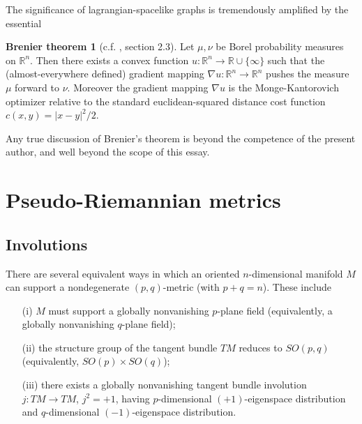 \documentclass[12pt]{amsart}
\theoremstyle{definition}
\newtheorem*{brenier}{Brenier theorem}
\theoremstyle{remark}
\newcommand{\bR}{\mathbb{R}}
\begin{document}
The significance of lagrangian-spacelike graphs is tremendously amplified by the essential
\begin{brenier}[c.f. \cite{V}, section 2.3]
Let $\mu, \nu$ be Borel probability measures on $\bR^n$. Then there exists a convex function $u:\bR^n\to \bR \cup \{\infty\}$ such that the (almost-everywhere defined) gradient mapping $\nabla u:\bR^n \to \bR^n$ pushes the measure $\mu$ forward to $\nu$. Moreover the gradient mapping $\nabla u$ is the Monge-Kantorovich optimizer relative to the standard euclidean-squared distance cost function $c(x,y)=|x-y|^2/2$. 
\end{brenier}

Any true discussion of Brenier's theorem is beyond the competence of the present author, and well beyond the scope of this essay. 









\section{Pseudo-Riemannian metrics}\label{metrics}
\subsection{Involutions}
There are several equivalent ways in which an oriented $n$-dimensional manifold $M$ can support a nondegenerate $(p,q)$-metric (with $p+q=n$). These include 
\begin{enumerate}
\item[(i)] $M$ must support a globally nonvanishing $p$-plane field (equivalently, a globally nonvanishing $q$-plane field); 
\item[(ii)] the structure group of the tangent bundle $TM$ reduces to $SO(p,q)$ (equivalently, $SO(p) \times SO(q)$); 
\item[(iii)] there exists a globally nonvanishing tangent bundle involution $j:TM \to TM$, $j^2=+1$, having $p$-dimensional $(+1)$-eigenspace distribution and $q$-dimensional $(-1)$-eigenspace distribution. 
\end{enumerate}
\end{document}
